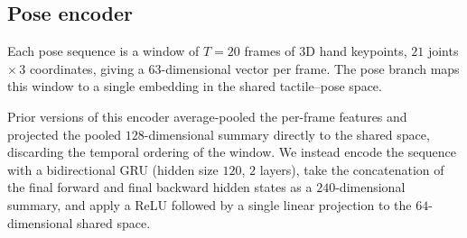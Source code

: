%
%

\newcommand{\TODO}[1]{\textcolor{red}{[TODO: #1]}}


\subsection{Pose encoder}
\label{sec:pose-encoder}

Each pose sequence is a window of $T=20$ frames of 3D hand keypoints,
$21$ joints $\times\,3$ coordinates, giving a $63$-dimensional vector per
frame. The pose branch maps this window to a single embedding in the shared
tactile--pose space.

Prior versions of this encoder average-pooled the per-frame features and
projected the pooled $128$-dimensional summary directly to the shared space,
discarding the temporal ordering of the window. We instead encode
the sequence with a bidirectional GRU (hidden size $120$, $2$ layers),
take the concatenation of the final forward and final backward hidden states
as a $240$-dimensional summary, and apply a ReLU followed by a single linear
projection to the $64$-dimensional shared space.

